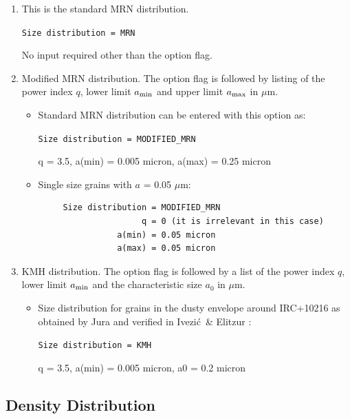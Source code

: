 \documentclass[11pt]{article}
\def\mic    {\hbox{$\mu$m}}
\def\Ivezic {Ivezi\'c}
\begin{document}
\begin{enumerate}

\item This is the standard MRN distribution.

{\tt  Size distribution = MRN}

No input required other than the option flag.

\item Modified MRN distribution.  The option flag is followed by listing of
    the power index $q$, lower limit $a_{\rm min}$ and upper limit $a_{\rm
    max}$ in \mic.

\begin{itemize}
\item Standard MRN distribution can be entered with this option as:

{\tt  Size distribution = MODIFIED\_MRN

 q = 3.5, a(min) = 0.005 micron, a(max) = 0.25 micron}

\item Single size grains with $a$ = 0.05 \mic:

\begin{verbatim}
     Size distribution = MODIFIED_MRN
                     q = 0 (it is irrelevant in this case)
                a(min) = 0.05 micron
                a(max) = 0.05 micron
\end{verbatim}
\end{itemize}

\item KMH distribution.  The option flag is followed by a list of the power
    index $q$, lower limit $a_{\rm min}$ and the characteristic size $a_0$
    in \mic.

\begin{itemize}
\item Size distribution for grains in the dusty envelope around
    IRC+10216 as obtained by Jura \cite{Jura} and verified in \Ivezic\
    \& Elitzur \cite{IE96b}:

{\tt  Size distribution = KMH

 q = 3.5, a(min) = 0.005 micron, a0 = 0.2 micron}

\end{itemize}
\end{enumerate}

\subsection{Density Distribution}
\label{density}
\end{document}
